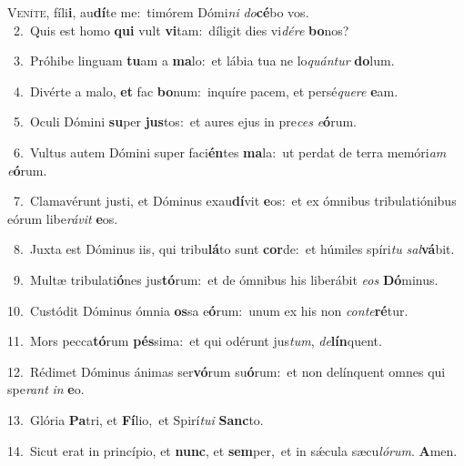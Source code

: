 \lettrine{\initial\textcolor{\initialcolor}{V}}{eníte,} fíli\-\textbf{i}\-, au\-\textbf{dí}\-te me:~\star timórem Dómi\textit{ni} \textit{do}\-\textbf{cé}bo vos.\\
{\numbfont\textcolor{\numbcolor}{~2.}}~Quis est homo \textbf{qui} vult \textbf{vi}\-tam:~\star díligit dies vi\-\textit{dé}\-\textit{re} \textbf{bo}\-nos?\par
{\numbfont\textcolor{\numbcolor}{~3.}}~Próhibe linguam \textbf{tu}\-am a \textbf{ma}\-lo:~\star et lábia tua ne lo\-\textit{quán}\-\textit{tur} \textbf{do}\-lum.\par
{\numbfont\textcolor{\numbcolor}{~4.}}~Divérte a malo, \textbf{et} fac \textbf{bo}\-num:~\star inquíre pacem, et persé\-\textit{que}\-\textit{re} \textbf{e}\-am.\par
{\numbfont\textcolor{\numbcolor}{~5.}}~Oculi Dómini \textbf{su}\-per \textbf{jus}\-tos:~\star et aures ejus in pre\textit{ces} \textit{e}\-\textbf{ó}rum.\par
{\numbfont\textcolor{\numbcolor}{~6.}}~Vultus autem Dómini super faci\-\textbf{én}\-tes \textbf{ma}\-la:~\star ut perdat de terra memóri\textit{am} \textit{e}\-\textbf{ó}rum.\par
{\numbfont\textcolor{\numbcolor}{~7.}}~Clamavérunt justi, et Dóminus exau\-\textbf{dí}\-vit \textbf{e}\-os:~\star et ex ómnibus tribulatiónibus eórum libe\-\textit{rá}\-\textit{vit} \textbf{e}\-os.\par
{\numbfont\textcolor{\numbcolor}{~8.}}~Juxta est Dóminus iis, qui tribu\-\textbf{lá}\-to sunt \textbf{cor}\-de:~\star et húmiles spíri\textit{tu} \textit{sal}\-\textbf{vá}bit.\par
{\numbfont\textcolor{\numbcolor}{~9.}}~Multæ tribulati\-\textbf{ó}\-nes jus\-\textbf{tó}\-rum:~\star et de ómnibus his liberábit \textit{e}\-\textit{os} \textbf{Dó}\-minus.\par
{\numbfont\textcolor{\numbcolor}{10.}}~Custódit Dóminus ómnia \textbf{os}\-sa e\-\textbf{ó}\-rum:~\star unum ex his non \textit{con}\-\textit{te}\textbf{ré}tur.\par
{\numbfont\textcolor{\numbcolor}{11.}}~Mors pecca\-\textbf{tó}\-rum \textbf{pés}\-sima:~\star et qui odérunt jus\-\textit{tum}\-, \textit{de}\-\textbf{lín}quent.\par
{\numbfont\textcolor{\numbcolor}{12.}}~Rédimet Dóminus ánimas ser\-\textbf{vó}\-rum su\-\textbf{ó}\-rum:~\star et non delínquent omnes qui spe\textit{rant} \textit{in} \textbf{e}\-o.\par
{\numbfont\textcolor{\numbcolor}{13.}}~Glória \textbf{Pa}\-tri, et \textbf{Fí}\-lio,~\star et Spirí\-\textit{tu}\-\textit{i} \textbf{Sanc}\-to.\par
{\numbfont\textcolor{\numbcolor}{14.}}~Sicut erat in princípio, et \textbf{nunc}\-, et \textbf{sem}\-per,~\star et in sǽcula sæcu\-\textit{ló}\-\textit{rum}. \textbf{A}\-men.\par
